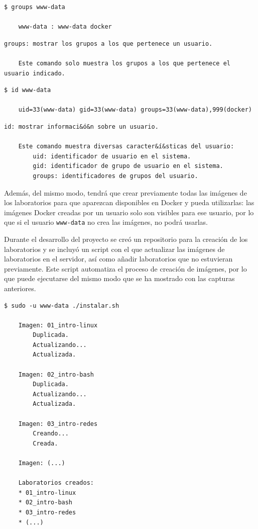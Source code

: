         \begin{lstlisting}[style=bash_style]
    $ groups www-data

    www-data : www-data docker
        \end{lstlisting}

        \begin{lstlisting}[style=comment_style]
    groups: mostrar los grupos a los que pertenece un usuario.

    Este comando solo muestra los grupos a los que pertenece el usuario indicado.
        \end{lstlisting}

        \begin{lstlisting}[style=bash_style, basicstyle=\ttfamily\scriptsize]
    $ id www-data

    uid=33(www-data) gid=33(www-data) groups=33(www-data),999(docker)
        \end{lstlisting}

        \begin{lstlisting}[style=comment_style]
    id: mostrar informaci&ó&n sobre un usuario.

    Este comando muestra diversas caracter&í&sticas del usuario:
        uid: identificador de usuario en el sistema.
        gid: identificador de grupo de usuario en el sistema.
        groups: identificadores de grupos del usuario.
        \end{lstlisting}

        Además, del mismo modo, tendrá que crear previamente todas las imágenes de los laboratorios para que aparezcan disponibles en Docker y pueda utilizarlas: las imágenes Docker creadas por un usuario solo son visibles para ese usuario, por lo que si el usuario \texttt{www-data} no crea las imágenes, no podrá usarlas.

        Durante el desarrollo del proyecto se creó un repositorio para la creación de los laboratorios y se incluyó un script con el que actualizar las imágenes de laboratorios en el servidor, así como añadir laboratorios que no estuvieran previamente. Este script automatiza el proceso de creación de imágenes, por lo que puede ejecutarse del mismo modo que se ha mostrado con las capturas anteriores.
        \\

        \begin{lstlisting}[style=bash_style]
    $ sudo -u www-data ./instalar.sh

    Imagen: 01_intro-linux
        Duplicada.
        Actualizando...
        Actualizada.

    Imagen: 02_intro-bash
        Duplicada.
        Actualizando...
        Actualizada.

    Imagen: 03_intro-redes
        Creando...
        Creada.

    Imagen: (...)

    Laboratorios creados:
    * 01_intro-linux
    * 02_intro-bash
    * 03_intro-redes
    * (...)
        \end{lstlisting}

